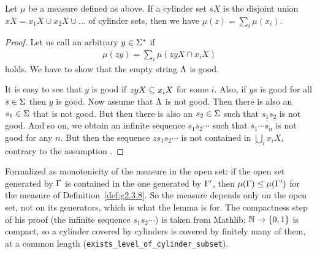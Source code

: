 \begin{lemma}\label{lem:cyl-measure}
  \leanok
  Let \( \mu \) be a measure defined as above.
If a cylinder set \( s X \) is the disjoint union \( xX=x_{1}X\cup x_{2}X\cup\dots \)
of cylinder sets, then we have \( \mu(z)=\sum_{i}\mu(x_{i}) \).
\end{lemma}
\begin{proof}
  \leanok
Let us call an arbitrary \( y\in\Sigma^{*} \)  if
 \begin{align*}
   \mu(zy)=\sum_{i}\mu(zyX\cap x_{i}X)
 \end{align*}
holds.
We have to show that the empty string \( \Lambda \) is good.

It is easy to see that \( y \) is good if \( zyX\subseteq x_{i}X \) for some \( i \).
Also, if \( ys \) is good for all \( s\in\Sigma \) then \( y \) is good.
Now assume that \( \Lambda \) is not good.
Then there is also an \( s_{1}\in\Sigma \) that is not good.
But then there is also an \( s_{2}\in\Sigma \) such that \( s_{1}s_{2} \) is not good.
And so on, we obtain an infinite sequence \( s_{1}s_{2}\dotsm \) such that
\( s_{1}\dotsm s_{n} \) is not good for any \( n \).
But then the sequence \( z s_{1}s_{2}\dotsm \) is not contained in
\( \bigcup_{i}x_{i}X \), contrary to the assumption .
\end{proof}

\begin{formalization}
Formalized as monotonicity of the measure in the open set: if the open set generated by
\( \Gamma \) is contained in the one generated by \( \Gamma' \), then \( \mu(\Gamma) \le \mu(\Gamma') \)
for the measure of Definition~\ref{def:g2.3.8}. So the measure depends only on the open set,
not on its generators, which is what the lemma is for. The compactness step of his proof
(the infinite sequence \( s_{1}s_{2}\dotsm \)) is taken from Mathlib: \( \mathbb{N} \to \{0,1\} \) is
compact, so a cylinder covered by cylinders is covered by finitely many of them, at a common
length (\texttt{exists\_level\_of\_cylinder\_subset}).
\end{formalization}

